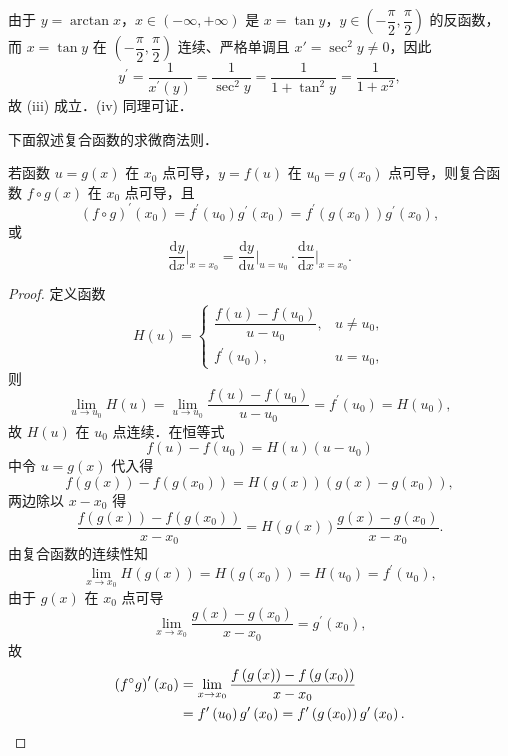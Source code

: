 由于 $y = \arctan x$，$x \in (-\infty, +\infty)$ 是 $x = \tan y$，$y \in \left(-\dfrac{\pi}{2}, \dfrac{\pi}{2}\right)$ 的反函数，而 $x = \tan y$ 在 $\left(-\dfrac{\pi}{2}, \dfrac{\pi}{2}\right)$ 连续、严格单调且 $x' = \sec^2 y \neq 0$，因此
\[
y^{\prime} = \frac{1}{x^{\prime}(y)} = \frac{1}{\sec^{2}y} = \frac{1}{1 + \tan^{2}y} = \frac{1}{1 + x^{2}},
\]
故 (iii) 成立．(iv) 同理可证．

下面叙述复合函数的求微商法则．

\begin{theorem}[复合函数求导法则]\label{thm:4-4}
若函数 $u = g(x)$ 在 $x_0$ 点可导，$y = f(u)$ 在 $u_0 = g(x_0)$ 点可导，则复合函数 $f \circ g(x)$ 在 $x_0$ 点可导，且
\[
\left(f\circ g\right)^{\prime}\left(x_0\right) = f^{\prime}\left(u_0\right)g^{\prime}\left(x_0\right) = f^{\prime}\left(g\left(x_0\right)\right)g^{\prime}\left(x_0\right),
\]
或
\[
\frac{\mathrm{d}y}{\mathrm{d}x}\bigg|_{x=x_0} = \frac{\mathrm{d}y}{\mathrm{d}u}\bigg|_{u=u_0}\cdot\frac{\mathrm{d}u}{\mathrm{d}x}\bigg|_{x=x_0}.
\]
\end{theorem}

\begin{proof}
定义函数
\[
H\left(u\right) = \begin{cases}
\dfrac{f\left(u\right) - f\left(u_0\right)}{u - u_0}, & u \neq u_0,\\[2ex]
f^{\prime}\left(u_0\right), & u = u_0,
\end{cases}
\]
则
\[
\lim_{u\to u_0}H(u) = \lim_{u\to u_0}\frac{f(u) - f\left(u_0\right)}{u - u_0} = f^{\prime}\left(u_0\right) = H\left(u_0\right),
\]
故 $H(u)$ 在 $u_0$ 点连续．在恒等式
\[
f(u) - f\left(u_0\right) = H(u)\left(u - u_0\right)
\]
中令 $u = g(x)$ 代入得
\[
f(g(x)) - f\left(g\left(x_0\right)\right) = H(g(x))\left(g(x) - g\left(x_0\right)\right),
\]
两边除以 $x - x_0$ 得
\[
\frac{f(g(x)) - f\left(g\left(x_0\right)\right)}{x - x_0} = H(g(x))\frac{g(x) - g\left(x_0\right)}{x - x_0}.
\]
由复合函数的连续性知
\[
\lim_{x\to x_0}H(g(x)) = H\left(g\left(x_0\right)\right) = H\left(u_0\right) = f^{\prime}\left(u_0\right),
\]
由于 $g(x)$ 在 $x_0$ 点可导
\[
\lim_{x\to x_0}\frac{g(x) - g\left(x_0\right)}{x - x_0} = g^{\prime}\left(x_0\right),
\]
故
\[
\begin{aligned}
\left(f^{\circ}g\right)^{\prime}\left(x_0\right) &= \lim_{x\to x_0}\frac{f\left(g\left(x\right)\right) - f\left(g\left(x_0\right)\right)}{x - x_0}\\
&= f^{\prime}\left(u_0\right)g^{\prime}\left(x_0\right) = f^{\prime}\left(g\left(x_0\right)\right)g^{\prime}\left(x_0\right).\qedhere
\end{aligned}
\]
\end{proof}

